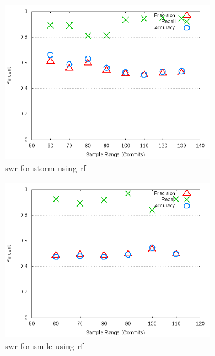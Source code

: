 \clearpage
\begin{figure}[!t]
\centering
\includegraphics[width=0.8\textwidth]{images/rf/test_1/storm_sample_range.png}
\caption{\gls{swr} for storm using \gls{rf}}
\label{fig:test_1_storm_rf}
\end{figure}

\begin{figure}[!t]
\centering
\includegraphics[width=0.8\textwidth]{images/rf/test_1/smile_sample_range.png}
\caption{\gls{swr} for smile using \gls{rf}}
\label{fig:test_1_smile_rf}
\end{figure}

